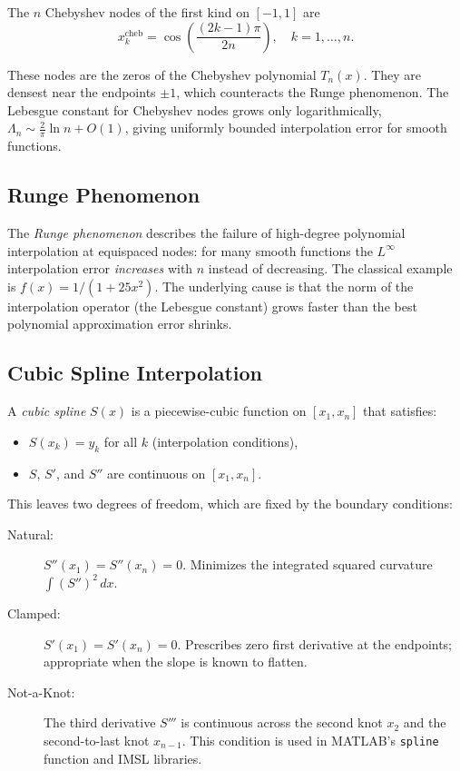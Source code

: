 \documentclass[11pt]{article}
\begin{document}
The $n$ Chebyshev nodes of the first kind on $[-1,1]$ are
\[
  x_k^{\mathrm{cheb}} = \cos\!\left(\frac{(2k-1)\pi}{2n}\right),
  \quad k = 1, \ldots, n.
\]

These nodes are the zeros of the Chebyshev polynomial $T_n(x)$.  They are
densest near the endpoints $\pm 1$, which counteracts the Runge phenomenon.
The Lebesgue constant for Chebyshev nodes grows only logarithmically,
$\Lambda_n \sim \frac{2}{\pi}\ln n + O(1)$, giving uniformly bounded
interpolation error for smooth functions.

\subsection{Runge Phenomenon}

The \emph{Runge phenomenon} describes the failure of high-degree polynomial
interpolation at equispaced nodes: for many smooth functions the $L^\infty$
interpolation error \emph{increases} with $n$ instead of decreasing.  The
classical example is $f(x) = 1/(1+25x^2)$.  The underlying cause is that the
norm of the interpolation operator (the Lebesgue constant) grows faster than
the best polynomial approximation error shrinks.

\subsection{Cubic Spline Interpolation}

A \emph{cubic spline} $S(x)$ is a piecewise-cubic function on $[x_1, x_n]$
that satisfies:
\begin{itemize}
  \item $S(x_k) = y_k$ for all $k$ (interpolation conditions),
  \item $S$, $S'$, and $S''$ are continuous on $[x_1, x_n]$.
\end{itemize}

This leaves two degrees of freedom, which are fixed by the boundary conditions:

\begin{description}
  \item[Natural:] $S''(x_1) = S''(x_n) = 0$.  Minimizes the integrated
        squared curvature $\int (S'')^2\,dx$.
  \item[Clamped:] $S'(x_1) = S'(x_n) = 0$.  Prescribes zero first derivative
        at the endpoints; appropriate when the slope is known to flatten.
  \item[Not-a-Knot:] The third derivative $S'''$ is continuous across the
        second knot $x_2$ and the second-to-last knot $x_{n-1}$.  This
        condition is used in MATLAB's \texttt{spline} function and IMSL
        libraries.
\end{description}
\end{document}

